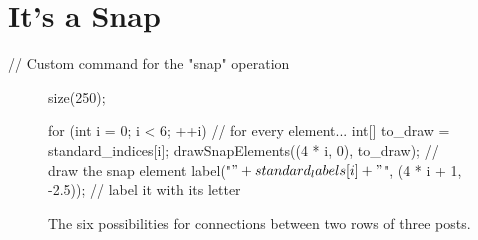\documentclass[../gatm.tex]{subfiles}
\begin{document}
\section{It's a Snap}

\newcommand\snap{\bullet} // Custom command for the "snap" operation

\begin{figure}[h]
	\begin{center}
		\begin{asy}
			size(250);
			
			for (int i = 0; i < 6; ++i) { // for every element...
				int[] to_draw = {standard_indices[i]};
				drawSnapElements((4 * i, 0), to_draw); // draw the snap element
				label("$" + standard_labels[i] + "$", (4 * i + 1, -2.5)); // label it with its letter
			}
		\end{asy}

		\caption{The six possibilities for connections between two rows of three posts.}
		\label{fig:all_3_cols}
	\end{center}
\end{figure}
\end{document}
